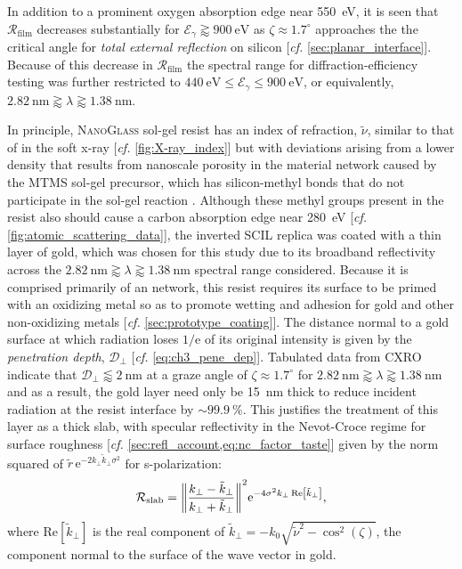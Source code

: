 In addition to a prominent oxygen absorption edge near \SI{550}{\electronvolt}, it is seen that $\mathcal{R}_{\text{film}}$ decreases substantially for $\mathcal{E}_{\gamma} \gtrapprox \SI{900}{\electronvolt}$ as $\zeta \approx 1.7^{\circ}$ approaches the the critical angle for \emph{total external reflection} on silicon [\emph{cf.\@} \cref{sec:planar_interface}]. 
Because of this decrease in $\mathcal{R}_{\text{film}}$ the spectral range for diffraction-efficiency testing was further restricted to $\SI{440}{\electronvolt} \leq \mathcal{E}_{\gamma} \leq \SI{900}{\electronvolt}$, or equivalently, $\SI{2.82}{\nm} \gtrapprox \lambda \gtrapprox \SI{1.38}{\nm}$. 

In principle, \textsc{NanoGlass} sol-gel resist has an index of refraction, $\tilde{\nu}$, similar to that of  in the soft x-ray [\emph{cf.\@} \cref{fig:X-ray_index}] but with deviations arising from a lower density that results from nanoscale porosity in the material network caused by the MTMS sol-gel precursor, which has silicon-methyl bonds that do not participate in the sol-gel reaction \cite[\emph{cf.\@} \cref{sec:grating_fab}]{Verschuuren10}. 
Although these methyl groups present in the resist also should cause a carbon absorption edge near \SI{280}{\electronvolt} [\emph{cf.\@} \cref{fig:atomic_scattering_data}], the inverted SCIL replica was coated with a thin layer of gold, which was chosen for this study due to its broadband reflectivity across the $\SI{2.82}{\nm} \gtrapprox \lambda \gtrapprox \SI{1.38}{\nm}$ spectral range considered. %
Because it is comprised primarily of an  network, this resist requires its surface to be primed with an oxidizing metal so as to promote wetting and adhesion for gold and other non-oxidizing metals [\emph{cf.\@} \cref{sec:prototype_coating}]. 
The distance normal to a gold surface at which radiation loses $1/\mathrm{e}$ of its original intensity is given by the \emph{penetration depth}, $\mathcal{D}_{\perp}$ [\emph{cf.\@} \cref{eq:ch3_pene_dep}]. 
Tabulated data from CXRO \cite{CXRO_database} indicate that $\mathcal{D}_{\perp} \lessapprox \SI{2}{\nm}$ at a graze angle of $\zeta \approx 1.7^{\circ}$ for $\SI{2.82}{\nm} \gtrapprox \lambda \gtrapprox \SI{1.38}{\nm}$ and as a result, the gold layer need only be \SI{15}{\nm} thick to reduce incident radiation at the resist interface by $\sim \SI{99.9}{\percent}$. 
This justifies the treatment of this layer as a thick slab, with specular reflectivity in the Nevot-Croce regime for surface roughness [\emph{cf.\@} \cref{sec:refl_account,eq:nc_factor_taste}] given by the norm squared of $\tilde{r} \, \mathrm{e}^{-2 k_{\perp} \tilde{k}_{\perp} \sigma^2}$ for s-polarization: %
\begin{equation}\label{eq:Au_refl}
 \mathcal{R}_{\text{slab}} = \norm{ \frac{k_{\perp} - \tilde{k}_{\perp}}{k_{\perp} + \tilde{k}_{\perp}} }^2 \mathrm{e}^{-4 \sigma^2 k_{\perp} \, \text{Re} \left[ \tilde{k}_{\perp} \right]} ,
 \end{equation}
where $\text{Re} \left[ \tilde{k}_{\perp} \right]$ is the real component of $\tilde{k}_{\perp} = - k_0 \sqrt{\tilde{\nu}^2 - \cos^2 \left( \zeta \right)}$, the component normal to the surface of the wave vector in gold. 

